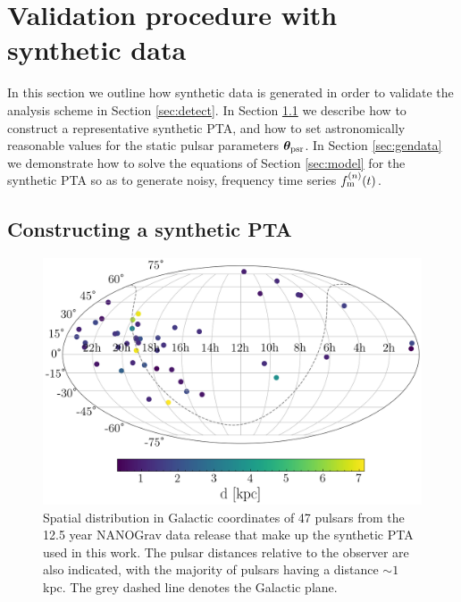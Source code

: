 \documentclass[fleqn,usenatbib,useAMS]{mnras}
\begin{document}
\section{Validation procedure with synthetic data} \label{sec:testing}
In this section we outline how synthetic data is generated in order to validate the analysis scheme in Section \ref{sec:detect}. In Section \ref{sec:synt_pta} we describe how to construct a representative synthetic PTA, and how to set astronomically reasonable values for the static pulsar parameters $\boldsymbol{\theta}_{\rm psr}$. In Section \ref{sec:gendata} we demonstrate how to solve the equations of Section \ref{sec:model} for the synthetic PTA so as to generate noisy, frequency time series $f_{\rm m}^{(n)}(t)$. 

\subsection{Constructing a synthetic PTA}\label{sec:synt_pta}
\begin{figure}
	\includegraphics[width=\columnwidth]{images/pulsar_distribution}
	\caption{Spatial distribution in Galactic coordinates of 47 pulsars from the 12.5 year NANOGrav data release that make up the synthetic PTA used in this work. The pulsar distances relative to the observer are also indicated, with the majority of pulsars having a distance $\sim 1$ kpc. The grey dashed line denotes the Galactic plane.}
	\label{fig:pulsar_distrib}
\end{figure}
\end{document}
